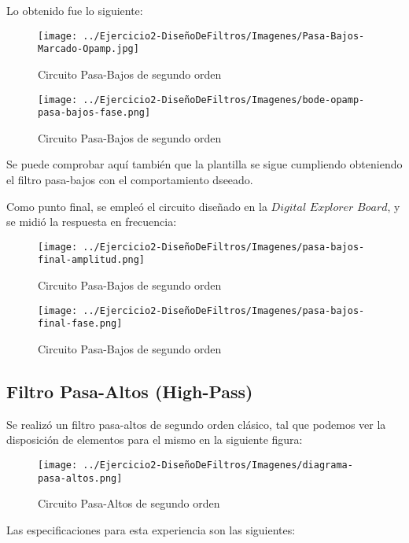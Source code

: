 Lo obtenido fue lo siguiente:

\begin{figure}[H]
    \centering
    \texttt{[image: ../Ejercicio2-DiseñoDeFiltros/Imagenes/Pasa-Bajos-Marcado-Opamp.jpg]}
    \caption{Circuito Pasa-Bajos de segundo orden}
\end{figure}

\begin{figure}[H]
    \centering
    \texttt{[image: ../Ejercicio2-DiseñoDeFiltros/Imagenes/bode-opamp-pasa-bajos-fase.png]}
    \caption{Circuito Pasa-Bajos de segundo orden}
\end{figure}

Se puede comprobar aquí también que la plantilla se sigue cumpliendo obteniendo el filtro pasa-bajos con el comportamiento dseeado.

Como punto final, se empleó el circuito diseñado en la $Digital$ $Explorer$ $Board$, y se midió la respuesta en frecuencia:

\begin{figure}[H]
    \centering
    \texttt{[image: ../Ejercicio2-DiseñoDeFiltros/Imagenes/pasa-bajos-final-amplitud.png]}
    \caption{Circuito Pasa-Bajos de segundo orden}
\end{figure}

\begin{figure}[H]
    \centering
    \texttt{[image: ../Ejercicio2-DiseñoDeFiltros/Imagenes/pasa-bajos-final-fase.png]}
    \caption{Circuito Pasa-Bajos de segundo orden}
\end{figure}



\subsection{Filtro Pasa-Altos (High-Pass)}

Se realizó un filtro pasa-altos de segundo orden clásico, tal que podemos
ver la disposición de elementos para el mismo en la siguiente figura:

\begin{figure}[H]
    \centering
    \texttt{[image: ../Ejercicio2-DiseñoDeFiltros/Imagenes/diagrama-pasa-altos.png]}
    \caption{Circuito Pasa-Altos de segundo orden}
\end{figure}

Las especificaciones para esta experiencia son las siguientes:

